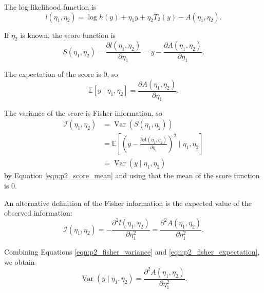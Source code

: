 \documentclass[letterpaper,11pt]{article}
\begin{document}
\begin{enumerate}
\begin{enumerate}
\begin{description}
      The log-likelihood function is
      \begin{equation}
        l\left(
          \eta_1, \eta_2
        \right) =
        \log h(y) + \eta_1y + \eta_2 T_2(y) - A\left(\eta_1,\eta_2\right).
      \end{equation}

      If $\eta_2$ is known, the score function is
      \begin{equation}
        S\left(\eta_1, \eta_2\right) = \frac{\partial l\left(\eta_1,\eta_2\right)}{\partial \eta_1}
        =
        y - \frac{\partial A\left(\eta_1,\eta_2\right)}{\partial \eta_1}.
      \end{equation}

      The expectation of the score is $0$, so
      \begin{equation}
        \boxed{\mathbb{E}\left[y \mid \eta_1, \eta_2\right] =
        \frac{\partial A\left(\eta_1,\eta_2\right)}{\partial \eta_1}.}
        \label{eqn:p2_score_mean}
      \end{equation}

      The variance of the score is Fisher information, so
      \begin{align}
        \mathcal{I}\left(\eta_1, \eta_2\right)
        &=
        \operatorname{Var}\left(
        S\left(\eta_1, \eta_2\right)
          \right) \nonumber\\
        &= \mathbb{E}\left[
          \left(y -
          \frac{\partial A\left(\eta_1,\eta_2\right)}{\partial \eta_1}
          \right)^2
          \mid
          \eta_1, \eta_2
          \right]\nonumber\\
        &= \operatorname{Var}\left(y \mid \eta_1, \eta_2\right)
          \label{eqn:p2_fisher_variance}
      \end{align}
      by Equation \ref{eqn:p2_score_mean}
      and using that the mean of the score function is $0$.

      An alternative definition of the Fisher information is the expected value
      of the observed information:
      \begin{equation}
        \mathcal{I}\left(\eta_1, \eta_2\right) =
        - \frac{\partial^2 l\left(\eta_1,\eta_2\right)}{\partial\eta_1^2}
        = \frac{\partial^2 A\left(\eta_1,\eta_2\right)}{\partial\eta_1^2}.
        \label{eqn:p2_fisher_expectation}
      \end{equation}

      Combining Equations \ref{eqn:p2_fisher_variance} and
      \ref{eqn:p2_fisher_expectation}, we obtain
      \begin{equation}
        \boxed{
          \operatorname{Var}\left(y \mid \eta_1, \eta_2\right)
          =
          \frac{\partial^2 A\left(\eta_1,\eta_2\right)}{\partial\eta_1^2}.
        }
        \label{eqn:p2_score_variance}
      \end{equation}


\end{description}
\end{enumerate}
\end{enumerate}
\end{document}
